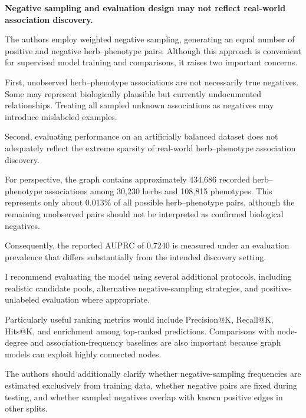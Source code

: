 \documentclass[11pt,american]{article}
\begin{document}
\begin{revresponse}

\end{revresponse}

\begin{revcomment}
\textbf{Negative sampling and evaluation design may not reflect real-world association discovery.}

The authors employ weighted negative sampling, generating an equal number of positive and negative herb--phenotype pairs. Although this approach is convenient for supervised model training and comparisons, it raises two important concerns.

First, unobserved herb--phenotype associations are not necessarily true negatives. Some may represent biologically plausible but currently undocumented relationships. Treating all sampled unknown associations as negatives may introduce mislabeled examples.

Second, evaluating performance on an artificially balanced dataset does not adequately reflect the extreme sparsity of real-world herb--phenotype association discovery.

For perspective, the graph contains approximately 434,686 recorded herb--phenotype associations among 30,230 herbs and 108,815 phenotypes. This represents only about 0.013\% of all possible herb--phenotype pairs, although the remaining unobserved pairs should not be interpreted as confirmed biological negatives.

Consequently, the reported AUPRC of 0.7240 is measured under an evaluation prevalence that differs substantially from the intended discovery setting.

I recommend evaluating the model using several additional protocols, including realistic candidate pools, alternative negative-sampling strategies, and positive-unlabeled evaluation where appropriate.

Particularly useful ranking metrics would include Precision@K, Recall@K, Hits@K, and enrichment among top-ranked predictions. Comparisons with node-degree and association-frequency baselines are also important because graph models can exploit highly connected nodes.

The authors should additionally clarify whether negative-sampling frequencies are estimated exclusively from training data, whether negative pairs are fixed during testing, and whether sampled negatives overlap with known positive edges in other splits.
\end{revcomment}
\end{document}
